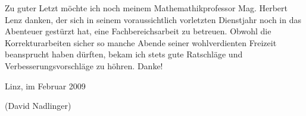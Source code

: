 Zu guter Letzt möchte ich noch meinem Mathemathikprofessor Mag. Herbert Lenz danken, der sich in seinem voraussichtlich vorletzten Dienstjahr noch in das Abenteuer gestürzt hat, eine Fachbereichsarbeit zu betreuen. Obwohl die Korrekturarbeiten sicher so manche Abende seiner wohlverdienten Freizeit beansprucht haben dürften, bekam ich stets gute Ratschläge und Verbesserungsvorschläge zu höhren. Danke!

\vspace{1.2cm}
Linz, im Februar 2009

\vspace{0.6cm}
{\small(David Nadlinger)}